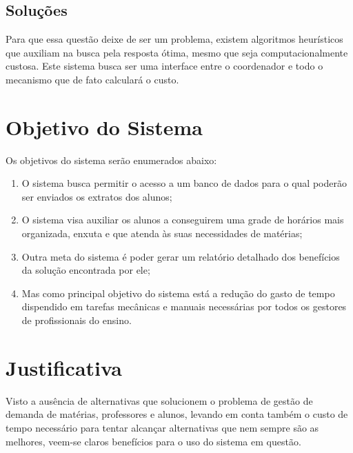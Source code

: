         \subsection{Soluções}

            Para que essa questão deixe de ser um problema, existem algoritmos heurísticos que auxiliam na busca pela resposta ótima, mesmo que seja computacionalmente custosa. Este sistema busca ser uma interface entre o coordenador e todo o mecanismo que de fato calculará o custo.

   \section{Objetivo do Sistema} %
   
        Os objetivos do sistema serão enumerados abaixo:
        
        \begin{enumerate}
            \item O sistema busca permitir o acesso a um banco de dados para o qual poderão ser enviados os extratos dos alunos;
            \item O sistema visa auxiliar os alunos a conseguirem uma grade de horários mais organizada, enxuta e que atenda às suas necessidades de matérias;
            \item Outra meta do sistema é poder gerar um relatório detalhado dos benefícios da solução encontrada por ele;
            \item Mas como principal objetivo do sistema está a redução do gasto de tempo dispendido em tarefas mecânicas e manuais necessárias por todos os gestores de profissionais do ensino.
        \end{enumerate}

   \section{Justificativa} %

        Visto a ausência de alternativas que solucionem o problema de gestão de demanda de matérias, professores e alunos, levando em conta também o custo de tempo necessário para tentar alcançar alternativas que nem sempre são as melhores, veem-se claros benefícios para o uso do sistema em questão.